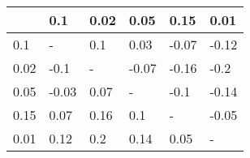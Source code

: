 \begin{tabular}{llllll}
\toprule
{} &   0.1 &  0.02 &  0.05 &  0.15 &  0.01 \\
\midrule
0.1  &     - &   0.1 &  0.03 & -0.07 & -0.12 \\
0.02 &  -0.1 &     - & -0.07 & -0.16 &  -0.2 \\
0.05 & -0.03 &  0.07 &     - &  -0.1 & -0.14 \\
0.15 &  0.07 &  0.16 &   0.1 &     - & -0.05 \\
0.01 &  0.12 &   0.2 &  0.14 &  0.05 &     - \\
\bottomrule
\end{tabular}
